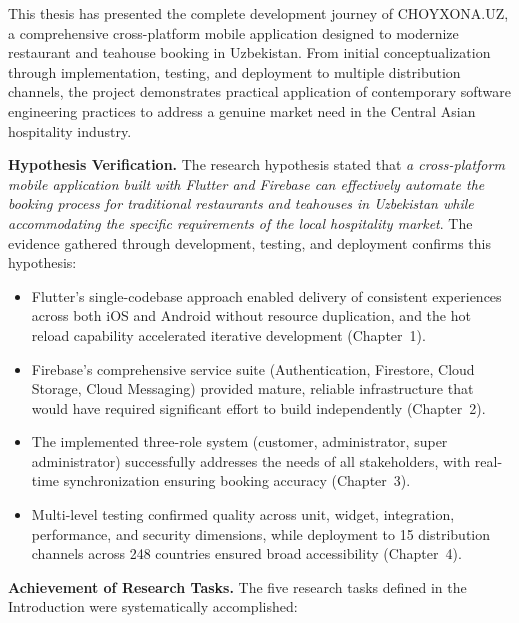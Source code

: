 
This thesis has presented the complete development journey of CHOYXONA.UZ, a comprehensive cross-platform mobile application designed to modernize restaurant and teahouse booking in Uzbekistan.
From initial conceptualization through implementation, testing, and deployment to multiple distribution channels, the project demonstrates practical application of contemporary software engineering practices to address a genuine market need in the Central Asian hospitality industry.

\vspace{4mm}
\textbf{Hypothesis Verification.}
The research hypothesis stated that \textit{a cross-platform mobile application built with Flutter and Firebase can effectively automate the booking process for traditional restaurants and teahouses in Uzbekistan while accommodating the specific requirements of the local hospitality market}.
The evidence gathered through development, testing, and deployment confirms this hypothesis:

\begin{itemize}
  \item Flutter's single-codebase approach enabled delivery of consistent experiences across both iOS and Android without resource duplication, and the hot reload capability accelerated iterative development (Chapter~1).
  \item Firebase's comprehensive service suite (Authentication, Firestore, Cloud Storage, Cloud Messaging) provided mature, reliable infrastructure that would have required significant effort to build independently (Chapter~2).
  \item The implemented three-role system (customer, administrator, super administrator) successfully addresses the needs of all stakeholders, with real-time synchronization ensuring booking accuracy (Chapter~3).
  \item Multi-level testing confirmed quality across unit, widget, integration, performance, and security dimensions, while deployment to 15 distribution channels across 248 countries ensured broad accessibility (Chapter~4).
\end{itemize}

\vspace{4mm}
\textbf{Achievement of Research Tasks.}
The five research tasks defined in the Introduction were systematically accomplished:


